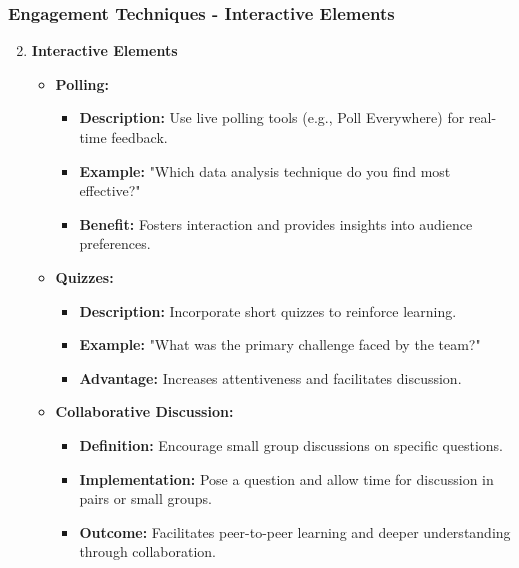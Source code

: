 \documentclass[aspectratio=169]{beamer}
\begin{document}
\begin{frame}[fragile]
    \frametitle{Engagement Techniques - Interactive Elements}
    \begin{enumerate}
        \setcounter{enumi}{1}
        \item \textbf{Interactive Elements}
            \begin{itemize}
                \item \textbf{Polling:}
                    \begin{itemize}
                        \item \textbf{Description:} Use live polling tools (e.g., Poll Everywhere) for real-time feedback.
                        \item \textbf{Example:} "Which data analysis technique do you find most effective?"
                        \item \textbf{Benefit:} Fosters interaction and provides insights into audience preferences.
                    \end{itemize}
                \item \textbf{Quizzes:}
                    \begin{itemize}
                        \item \textbf{Description:} Incorporate short quizzes to reinforce learning.
                        \item \textbf{Example:} "What was the primary challenge faced by the team?"
                        \item \textbf{Advantage:} Increases attentiveness and facilitates discussion.
                    \end{itemize}
                \item \textbf{Collaborative Discussion:}
                    \begin{itemize}
                        \item \textbf{Definition:} Encourage small group discussions on specific questions.
                        \item \textbf{Implementation:} Pose a question and allow time for discussion in pairs or small groups.
                        \item \textbf{Outcome:} Facilitates peer-to-peer learning and deeper understanding through collaboration.
                    \end{itemize}
            \end{itemize}
    \end{enumerate}
\end{frame}
\end{document}
